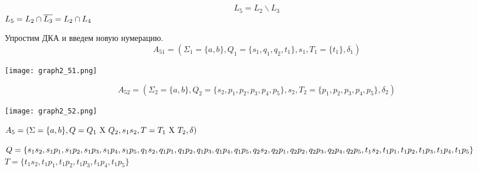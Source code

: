 \documentclass[a4paper, 12pt]{article}
\begin{document}
\subsection{}
$$L_5 = L_2 \backslash L_3$$
$L_5 = L_2 \cap \overline{L_3} = L_2 \cap L_4\\$

Упростим ДКА и введем новую нумерацию.
$$A_{51} = (\Sigma_1 = \{a, b\}, Q_1 = \{s_1, q_1, q_2, t_1\}, s_1, T_1 = \{t_1\}, \delta_1)$$
\begin{center}
    \texttt{[image: graph2\_51.png]}
\end{center}
$$A_{52} = (\Sigma_2 = \{a, b\}, Q_2 = \{s_2, p_1, p_2, p_3, p_4, p_5\}, s_2, T_2 = \{p_1, p_2, p_3, p_4, p_5\}, \delta_2)$$
\begin{center}
    \texttt{[image: graph2\_52.png]}
\end{center}
$A_5 = (\Sigma = \{a, b\}, Q = Q_1 \text{ X } Q_2, s_1s_2, T = T_1 \text{ X } T_2, \delta)\\$

$Q = \{ s_1s_2, s_1p_1, s_1p_2, s_1p_3, s_1p_4, s_1p_5, \\
q_1s_2, q_1p_1, q_1p_2, q_1p_3, q_1p_4, q_1p_5, \\
q_2s_2, q_2p_1, q_2p_2, q_2p_3, q_2p_4, q_2p_5, \\
t_1s_2, t_1p_1, t_1p_2, t_1p_3, t_1p_4, t_1p_5\}\\$
$T = \{ t_1s_2, t_1p_1, t_1p_2, t_1p_3, t_1p_4, t_1p_5\}$
\end{document}
